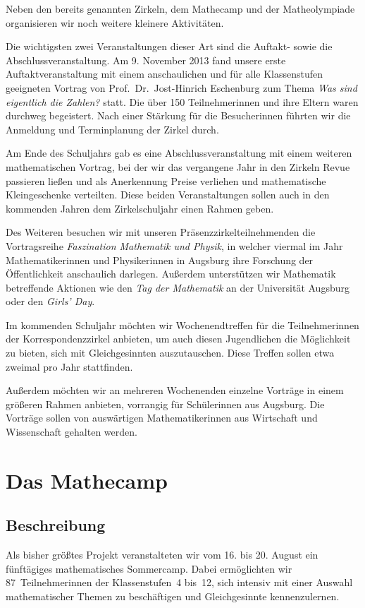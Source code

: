 \documentclass[12pt]{zettel}
\begin{document}
Neben den bereits genannten Zirkeln, dem Mathecamp und der
Matheolympiade organisieren wir noch weitere kleinere
Aktivitäten.

Die wichtigsten zwei Veranstaltungen dieser Art sind die Auftakt- sowie die
Abschlussveranstaltung. Am 9. November 2013 fand unsere erste
Auftaktveranstaltung mit einem anschaulichen und für alle Klassenstufen
geeigneten Vortrag von
Prof.~Dr.~Jost-Hinrich Eschenburg zum Thema \emph{Was sind eigentlich die
Zahlen?} statt.
Die über 150 Teilnehmerinnen und ihre Eltern waren durchweg
begeistert. Nach einer Stärkung für die Besucherinnen führten wir
die Anmeldung und Terminplanung der Zirkel durch.

Am Ende des Schuljahrs gab es eine Abschlussveranstaltung mit einem
weiteren mathematischen Vortrag, bei der wir
das vergangene Jahr in den Zirkeln Revue passieren ließen und als Anerkennung
Preise verliehen und mathematische Kleingeschenke verteilten. Diese beiden Veranstaltungen sollen
auch in den kommenden Jahren dem Zirkelschuljahr einen Rahmen geben.

Des Weiteren besuchen wir mit unseren Präsenzzirkelteilnehmenden die
Vortragsreihe \emph{Faszination Mathematik und Physik}, in welcher viermal im
Jahr Mathematikerinnen und Physikerinnen in Augsburg ihre Forschung der
Öffentlichkeit anschaulich darlegen. Außerdem unterstützen wir
Mathematik betreffende Aktionen wie den \emph{Tag der Mathematik} an
der Universität Augsburg oder den \emph{Girls' Day}.

Im kommenden Schuljahr möchten wir Wochenendtreffen für die Teilnehmerinnen der Korrespondenzzirkel anbieten, um auch diesen Jugendlichen die
Möglichkeit zu bieten, sich mit Gleichgesinnten auszutauschen. Diese Treffen
sollen etwa zweimal pro Jahr stattfinden.

Außerdem möchten wir an mehreren Wochenenden einzelne Vorträge in einem
größeren Rahmen anbieten, vorrangig für Schülerinnen aus Augsburg.
Die Vorträge sollen von auswärtigen Mathematikerinnen aus Wirtschaft und Wissenschaft gehalten werden.


\section{Das Mathecamp}

\subsection{Beschreibung}

Als bisher größtes Projekt veranstalteten wir vom 16. bis 20. August ein fünftägiges
mathematisches Sommercamp. Dabei ermöglichten wir 87~Teilnehmerinnen
der Klassenstufen~4 bis~12, sich intensiv mit einer Auswahl
mathematischer Themen zu beschäftigen und Gleichgesinnte kennenzulernen.
\end{document}
